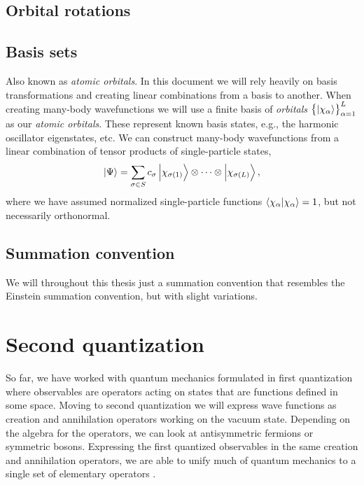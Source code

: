         \subsection{Orbital rotations}

        \subsection{Basis sets}
            Also known as \emph{atomic orbitals}.
            In this document we will rely heavily on basis transformations and
            creating linear combinations from a basis to another. When creating
            many-body wavefunctions we will use a finite basis of \emph{orbitals}
            $\left\{ \ket{\chi_{\alpha}} \right\}_{\alpha = 1}^{L}$ as our \emph{atomic
            orbitals}. These represent known basis states, e.g., the harmonic
            oscillator eigenstates, etc. We can construct many-body wavefunctions
            from a linear combination of tensor products of single-particle states,
            \begin{align}
                \ket{\Psi}
                = \sum_{\sigma \in S} c_{\sigma}
                \ket{\chi_{\sigma(1)}}\otimes\dots\otimes\ket{\chi_{\sigma(L)}},
            \end{align}
            where we have assumed normalized single-particle functions
            $\braket{\chi_{\alpha}}{\chi_{\alpha}} = 1$, but not necessarily
            orthonormal.
        \subsection{Summation convention}
            We will throughout this thesis just a summation convention that
            resembles the Einstein summation convention, but with slight
            variations.


    \section{Second quantization}
        So far, we have worked with quantum mechanics formulated in first
        quantization where observables are operators acting on states that are
        functions defined in some space.
        Moving to second quantization we will express wave functions as creation
        and annihilation operators working on the vacuum state.
        Depending on the algebra for the operators, we can look at antisymmetric
        fermions or symmetric bosons.
        Expressing the first quantized observables in the same creation and
        annihilation operators, we are able to unify much of quantum mechanics
        to a single set of elementary operators \cite{helgaker-molecular}.

